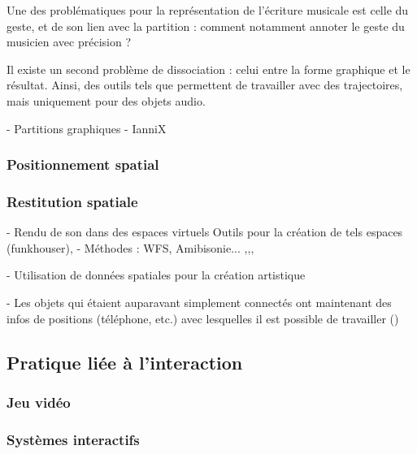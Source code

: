 \documentclass[french,12pt]{article}
\begin{document}
Une des problématiques pour la représentation de l'écriture musicale est celle du geste, et de son lien avec la partition : comment notamment annoter le geste du musicien avec précision ?

Il existe un second problème de dissociation : celui entre la forme graphique et le résultat. Ainsi, des outils tels que %
permettent de  travailler avec des trajectoires, mais uniquement pour des objets audio.

- Partitions graphiques
- IanniX

\subsubsection{Positionnement spatial}
\cite{wozniewski_framework_2006}
\subsubsection{Restitution spatiale}
- Rendu de son dans des espaces virtuels \cite{funkhouser_beam_1998,cheng_design_2014,tsingos_fast_1998,taylor_guided_2012,raghuvanshi_parametric_2014,rodriguez_performance_2014}
Outils pour la création de tels espaces (funkhouser), 
- Méthodes : WFS, Amibisonie... \cite{lim_3d_2015}
\cite{perez-lopez_3dj_2015}
\cite{noisternig_3d_2003}\cite{bates_comparative_2007},\cite{tang_assistive_2014},\cite{sasamoto_controlling_2013},\cite{delerue_spatialisation_2004}

- Utilisation de données spatiales pour la création artistique \cite{naveda_topos_2014}

- Les objets qui étaient auparavant simplement connectés ont maintenant des infos de positions (téléphone, etc.) avec lesquelles il est possible de travailler (\cite{beal_spacetime_2015})
\subsection{Pratique liée à l'interaction}
\subsubsection{Jeu vidéo}
\cite{le_prado_ecriture_2013}
\cite{salazar_modelisation_2004}

\subsubsection{Systèmes interactifs}
\cite{chalon_realite_2004}
\cite{jankowski_advances_2015}
\cite{shen_blowbrush:_2014}
\cite{gustafson_imaginary_2010}
\end{document}
